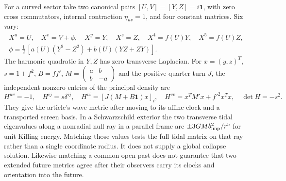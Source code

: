 \documentclass[11pt,a4paper]{article}
\newcommand{\id}{\mathbf1}
\begin{document}
For a curved sector take two canonical pairs \([U,V]=[Y,Z]=i\id\), with zero cross commutators, internal contraction \(\eta_{uv}=1\), and four constant matrices. Six vary:
\begin{gather*}
 X^u=U,\quad X^v=V+\phi,\quad X^y=Y,\quad X^z=Z,\quad
 X^4=f(U)Y,\quad X^5=f(U)Z,\\
 \phi=\tfrac12\,[a(U)(Y^2-Z^2)+b(U)(YZ+ZY)] .
\end{gather*}
The harmonic quadratic in \(Y,Z\) has zero transverse Laplacian. For \(x=(y,z)^T\), \(s=1+f^2\), \(B=ff'\), \(M=\left(\begin{smallmatrix}a&b\\ b&-a\end{smallmatrix}\right)\) and the positive quarter-turn \(J\), the independent nonzero entries of the principal density are
\[
 H^{uv}=-1,\quad H^{ij}=s\delta^{ij},\quad
 H^{vi}=[J(M+B\id)x]_i,\quad H^{vv}=x^TM'x+f'^2 x^Tx,\quad \det H=-s^2.
\]
They give the article's wave metric after moving to its affine clock and a transported screen basis. In a Schwarzschild exterior the two transverse tidal eigenvalues along a nonradial null ray in a parallel frame are \(\pm3GM b_{\rm imp}^2/r^5\) for unit Killing energy. Matching those values tests the full tidal matrix on that ray rather than a single coordinate radius. It does not supply a global collapse solution. Likewise matching a common open past does not guarantee that two extended future metrics agree after their observers carry its clocks and orientation into the future.








\end{document}
